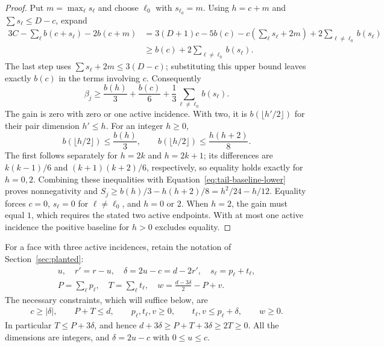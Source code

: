 \begin{proof}
Put $m=\max_\ell s_\ell$ and choose $\ell_0$ with $s_{\ell_0}=m$.
Using $h=c+m$ and $\sum s_\ell\le D-c$, expand
\begin{align*}
 3C-\sum_\ell b(c+s_\ell)-2b(c+m)
 &=3(D+1)c-5b(c)
   -c\left(\sum_\ell s_\ell+2m\right)
   +2\sum_{\ell\ne\ell_0}b(s_\ell)\\
 &\ge b(c)+2\sum_{\ell\ne\ell_0}b(s_\ell).
\end{align*}
The last step uses $\sum s_\ell+2m\le3(D-c)$; substituting this upper
bound leaves exactly $b(c)$ in the terms involving $c$.  Consequently
\begin{equation}\label{eq:tail-baseline-lower}
 \beta_j\ge\frac{b(h)}3+\frac{b(c)}6
             +\frac13\sum_{\ell\ne\ell_0}b(s_\ell).
\end{equation}
The gain is zero with zero or one active incidence.  With two, it is
$b(\lfloor h'/2\rfloor)$ for their pair dimension $h'\le h$.  For an
integer $h\ge0$,
\[
 b(\lfloor h/2\rfloor)\le\frac{b(h)}3,
 \qquad b(\lfloor h/2\rfloor)\le\frac{h(h+2)}8.
\]
The first follows separately for $h=2k$ and $h=2k+1$; its differences
are $k(k-1)/6$ and $(k+1)(k+2)/6$, respectively, so equality holds
exactly for $h=0,2$.  Combining these inequalities with
Equation~\eqref{eq:tail-baseline-lower} proves nonnegativity and
$S_j\ge b(h)/3-h(h+2)/8=h^2/24-h/12$.
Equality forces $c=0$, $s_\ell=0$ for $\ell\ne\ell_0$, and $h=0$ or
$2$.  When $h=2$, the gain must equal $1$, which requires the stated
two active endpoints.  With at most one active incidence the positive
baseline for $h>0$ excludes equality.
\end{proof}

For a face with three active incidences, retain the notation of
Section~\ref{sec:planted}:
\[
 \begin{gathered}
 u,\quad r'=r-u,\quad\delta=2u-c=d-2r',\quad
 s_\ell=p_\ell+t_\ell,\\
 P=\sum_\ell p_\ell,\quad T=\sum_\ell t_\ell,
 \quad w=\frac{d-3\delta}{2}-P+v.
 \end{gathered}
\]
The necessary constraints, which will suffice below, are
\begin{equation}\label{eq:tail-feasible}
 \begin{gathered}
 c\ge|\delta|,\qquad P+T\le d,\qquad
 p_\ell,t_\ell,v\ge0,\qquad
 t_\ell,v\le p_\ell+\delta,\qquad w\ge0.
 \end{gathered}
\end{equation}
In particular $T\le P+3\delta$, and hence
$d+3\delta\ge P+T+3\delta\ge2T\ge0$.
All the dimensions are integers, and $\delta=2u-c$ with $0\le u\le c$.


